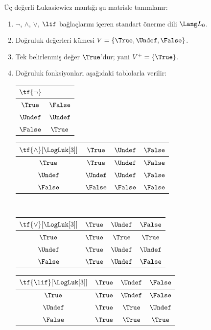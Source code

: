 \begin{defn}
Üç değerli \L ukasiewicz mantığı şu matrisle tanımlanır:
\begin{enumerate}
  \item $\lnot$, $\land$, $\lor$, $\lif$ bağlaçlarını içeren standart
  önerme dili $\Lang L_0$.
  \item Doğruluk değerleri kümesi $V = \{\True, \Undef, \False\}$.
  \item Tek belirlenmiş değer $\True$'dur; yani $V^+ = \{\True\}$.
  \item Doğruluk fonksiyonları aşağıdaki tablolarla verilir:
  \begin{center}
    \begin{tabular}{c|c} 
      $\tf{\lnot}$ & \\ 
      \hline  
      $\True$ & $\False$ \\ 
      $\Undef$ & $\Undef$ \\
      $\False$ & $\True$ 
    \end{tabular}
    \quad
    \begin{tabular}{c|ccc} 
      $\tf{\land}[\LogLuk[3]]$ & $\True$ & $\Undef$ & $\False$ \\ 
      \hline 
      $\True$ & $\True$ & $\Undef$ & $\False$ \\ 
      $\Undef$ & $\Undef$ & $\Undef$ & $\False$\\ 
      $\False$ & $\False$ & $\False$ & $\False$ 
    \end{tabular}
    \\[2ex]
    \begin{tabular}{c|ccc} 
      $\tf{\lor}[\LogLuk[3]]$ & $\True$ & $\Undef$ & $\False$ \\ 
      \hline 
      $\True$ & $\True$ & $\True$ & $\True$ \\ 
      $\Undef$ & $\True$ & $\Undef$ & $\Undef$ \\
      $\False$ & $\True$ & $\Undef$ & $\False$ 
    \end{tabular}
    \quad
    \begin{tabular}{c|ccc} 
      $\tf{\lif}[\LogLuk[3]]$ & $\True$ & $\Undef$ & $\False$ \\ 
      \hline 
      $\True$ & $\True$ & $\Undef$ & $\False$ \\ 
      $\Undef$ & $\True$ & $\True$ & $\Undef$  \\ 
      $\False$ & $\True$ & $\True$ & $\True$ 
    \end{tabular}
  \end{center} 
\end{enumerate}
\end{defn}

